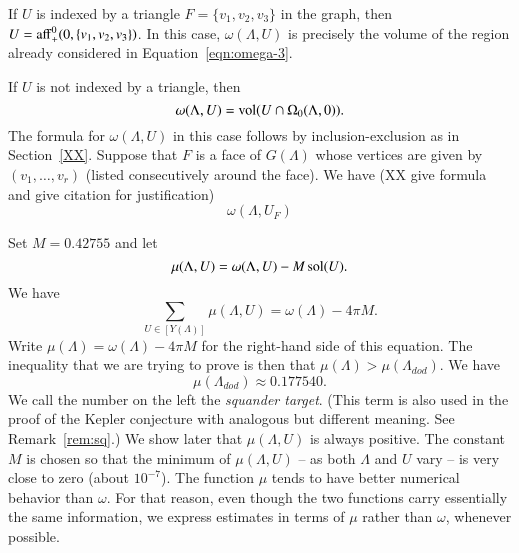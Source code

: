 If $U$ is indexed by a triangle $F=\{v_1,v_2,v_3\}$ in the graph,
then $U = {\operatorname{aff}}_+^0(0,\{v_1,v_2,v_3\})$.  In this case,
$\omega(\Lambda,U)$ is precisely the volume of the region
already considered in Equation~\ref{eqn:omega-3}.

If $U$ is not indexed by a triangle, then
   $$\omega(\Lambda,U) = {\operatorname{vol}}(U\cap\Omega_0(\Lambda,0)).$$
The formula for $\omega(\Lambda,U)$ in this case follows
by inclusion-exclusion as in Section~\ref{XX}.  Suppose
that $F$ is a face of $G(\Lambda)$ whose vertices are given
by $(v_1,\ldots,v_r)$ (listed consecutively around the face).
We have (XX give formula and give citation for justification)
$$
\omega(\Lambda,U_F) 
$$

Set $M=0.42755$ and let
 $$\mu(\Lambda,U)= \omega(\Lambda,U) - M \operatorname{sol}(U).$$
We have
$$
\sum_{U\in[Y(\Lambda)]} \mu(\Lambda,U) = \omega(\Lambda) -  4\pi M.
$$
Write $\mu(\Lambda)= \omega(\Lambda)- 4\pi M$ for the right-hand side of this equation.  The inequality that we are trying to prove is then
that $\mu(\Lambda) > \mu(\Lambda_{dod})$.  
We have 
$$
  \mu(\Lambda_{dod}) \approx 0.177540.
$$
We call the number on the left the {\it squander target}.  (This term
is also used in the proof of the Kepler conjecture with
analogous but different meaning.  See Remark~\ref{rem:sq}.)  We show
later that $\mu(\Lambda,U)$ is always positive.  The constant
$M$ is chosen so that the minimum of $\mu(\Lambda,U)$ -- as
both $\Lambda$ and $U$  vary -- is very close to zero (about $10^{-7}$).
The function $\mu$ tends to have better numerical behavior
than $\omega$.  For that reason, even though the two
functions carry essentially the same information,
we express estimates in terms
of $\mu$ rather than $\omega$, whenever possible.

